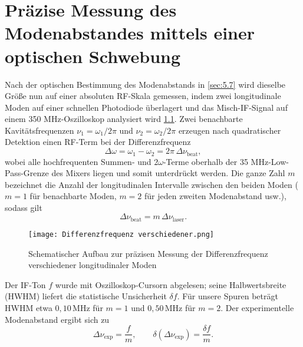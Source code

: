 \chapter{ Präzise Messung des Modenabstandes mittels einer
optischen Schwebung} \label{sec:5.8}

Nach der optischen Bestimmung des Modenabstands in \cref{sec:5.7} wird dieselbe Größe nun auf einer absoluten RF-Skala gemessen, indem zwei longitudinale Moden auf einer schnellen Photodiode überlagert und das Misch-IF-Signal auf einem 350 MHz-Oszilloskop analysiert wird \cref{fig:difffreq}. Zwei benachbarte Kavitätsfrequenzen $\nu_{1} = \omega_{1}/2\pi$ und $\nu_{2} = \omega_{2}/2\pi$ erzeugen nach quadratischer Detektion einen RF-Term bei der Differenzfrequenz
\begin{equation*}
  \Delta\omega = \omega_{1} - \omega_{2} = 2\pi\,\Delta\nu_{\mathrm{beat}},
\end{equation*}
wobei alle hochfrequenten Summen- und $2\omega$-Terme oberhalb der 35 MHz-Low-Pass-Grenze des Mixers liegen und somit unterdrückt werden. Die ganze Zahl $m$ bezeichnet die Anzahl der longitudinalen Intervalle zwischen den beiden Moden ($m=1$ für benachbarte Moden, $m=2$ für jeden zweiten Modenabstand usw.), sodass gilt
\begin{equation}
  \Delta\nu_{\mathrm{beat}} = m\,\Delta\nu_{\mathrm{laser}}.
\end{equation}

\begin{figure}[htbp]
    \centering
    \texttt{[image: Differenzfrequenz verschiedener.png]}
     \caption{Schematischer Aufbau zur präzisen Messung der Differenzfrequenz verschiedener longitudinaler Moden \cite{praktikum}}
    \label{fig:difffreq}
  \end{figure}

Der IF-Ton $f$ wurde mit Oszilloskop-Cursorn abgelesen; seine Halbwertsbreite (HWHM) liefert die statistische Unsicherheit $\delta f$. Für unsere Spuren beträgt HWHM etwa $0{,}10\,\mathrm{MHz}$ für $m=1$ und $0{,}50\,\mathrm{MHz}$ für $m=2$. Der experimentelle Modenabstand ergibt sich zu
\begin{equation}
  \Delta\nu_{\mathrm{exp}} = \frac{f}{m}, 
  \qquad
  \delta(\Delta\nu_{\mathrm{exp}}) = \frac{\delta f}{m}.
\end{equation}

